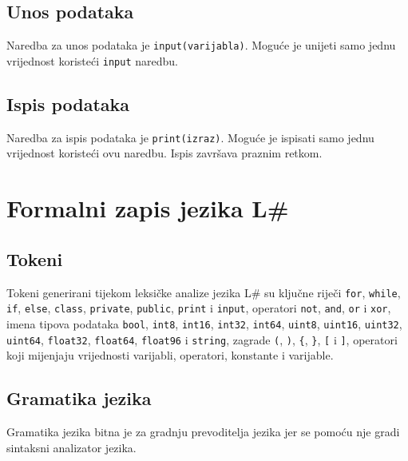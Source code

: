 \documentclass[times, utf8, zavrsni]{fer}
\begin{document}
\section{Unos podataka}
Naredba za unos podataka je \verb|input(varijabla)|. Moguće je unijeti samo jednu vrijednost koristeći \verb|input|
naredbu.

\section{Ispis podataka}
Naredba za ispis podataka je \verb|print(izraz)|. Moguće je ispisati samo jednu vrijednost koristeći ovu naredbu.
Ispis završava praznim retkom. %

\chapter{Formalni zapis jezika L\#}
\section{Tokeni}
Tokeni generirani tijekom leksičke analize jezika L\# su ključne riječi \verb|for|, \verb|while|, 
\verb|if|, \verb|else|, \verb|class|, \verb|private|, \verb|public|, \verb|print| i \verb|input|, operatori 
\verb|not|, \verb|and|, \verb|or| i \verb|xor|, imena tipova podataka \verb|bool|, \verb|int8|, \verb|int16|, \verb|int32|, \verb|int64|, \verb|uint8|,
\verb|uint16|, \verb|uint32|, \verb|uint64|, \verb|float32|, \verb|float64|, \verb|float96| i \verb|string|,
zagrade \verb|(|, \verb|)|, \verb|{|, \verb|}|, \verb|[| i \verb|]|, operatori koji mijenjaju vrijednosti varijabli,
operatori, konstante i varijable.

\section{Gramatika jezika}
Gramatika jezika bitna je za gradnju prevoditelja jezika jer se pomoću nje gradi sintaksni analizator jezika.
\end{document}
